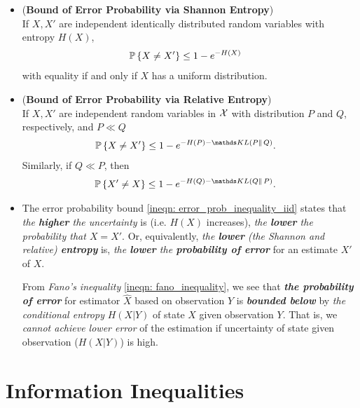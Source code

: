\documentclass[11pt]{article}
\begin{document}
\begin{itemize}
\item \begin{lemma} (\textbf{Bound of Error Probability via Shannon Entropy}) \citep{thomas2006elements} \\
If $X, X'$ are independent identically distributed random variables with entropy $H(X)$, 
\begin{align}
{\mathbb P}\left\{X \neq X'\right\} &\le 1 - e^{-H(X)} \label{ineqn: error_prob_inequality_iid}
\end{align} with equality if and only if $X$ has a uniform distribution.
\end{lemma}

\item \begin{corollary}  (\textbf{Bound of Error Probability via Relative Entropy}) \citep{thomas2006elements} \\
If $X, X'$ are independent random variables in ${\mathcal X}$ with distribution $P$ and $Q$, respectively, and $P \ll Q$ 
\begin{align}
\bP\set{X \neq X'} &\le 1 - e^{-H(P) - \kl{P}{Q}}. \label{ineqn: error_prob_inequality_kl}
\end{align} Similarly, if $Q \ll P$, then
\begin{align*}
\bP\set{X' \neq X} &\le 1 - e^{-H(Q) - \kl{Q}{P}}.
\end{align*}
\end{corollary}

\item \begin{remark}
The error probability bound \eqref{ineqn: error_prob_inequality_iid} states that \emph{the \textbf{higher} the uncertainty} is (i.e. $H(X)$ increases), \emph{the \textbf{lower} the probability that $X = X'$}. Or, equivalently, \emph{the \textbf{lower} (the Shannon and relative) \textbf{entropy}} is, \emph{the \textbf{lower} the \textbf{probability of error}} for an estimate $X'$ of $X$.

From \emph{Fano's inequality} \eqref{ineqn: fano_inequality}, we see that \emph{\textbf{the probability of error}} for estimator $\widehat{X}$ based on observation $Y$ is \emph{\textbf{bounded below}} by  \emph{the conditional entropy} $H(X|Y)$ of state $X$ given observation $Y$. That is, we \emph{cannot achieve lower error} of the estimation if uncertainty of state given observation ($H(X|Y)$) is high. 
\end{remark}
\end{itemize}

\section{Information Inequalities}
\end{document}
